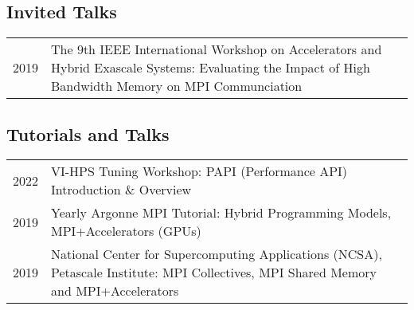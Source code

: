 \documentclass[a4paper,10pt]{article}
\begin{document}
\subsection*{Invited Talks}
\begin{tabular}{rp{11cm}}
    2019 & The 9th IEEE International Workshop on Accelerators and Hybrid Exascale Systems: Evaluating the Impact of High Bandwidth Memory on MPI Communciation\\
\end{tabular}

\subsection*{Tutorials and Talks}
\begin{tabular}{rp{11cm}}
    2022 & VI-HPS Tuning Workshop: PAPI (Performance API) Introduction \& Overview \\
    2019 & Yearly Argonne MPI Tutorial: Hybrid Programming Models, MPI+Accelerators (GPUs) \\
    2019 & National Center for Supercomputing Applications (NCSA), Petascale Institute: MPI Collectives, MPI Shared Memory and MPI+Accelerators\\
\end{tabular}
\end{document}
